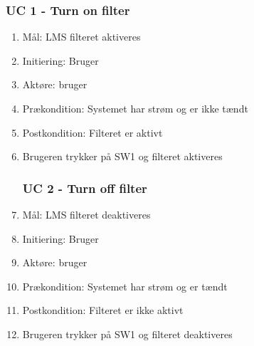 \subsubsection{UC 1 - Turn on filter}
\begin{enumerate}
\item Mål: LMS filteret aktiveres

\item Initiering: Bruger

\item Aktøre: bruger

\item Prækondition: Systemet har strøm og er ikke tændt

\item Postkondition: Filteret er aktivt

\item Brugeren trykker på SW1 og filteret aktiveres



\subsubsection{UC 2 - Turn off filter}

\item Mål: LMS filteret deaktiveres

\item Initiering: Bruger

\item Aktøre: bruger

\item Prækondition: Systemet har strøm og er tændt

\item Postkondition: Filteret er ikke aktivt

\item Brugeren trykker på SW1 og filteret deaktiveres


\end{enumerate}

\newpage
